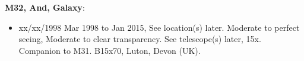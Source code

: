 {\bf M32, And, Galaxy}:
\begin{itemize}
\item xx/xx/1998 Mar 1998 to Jan 2015, See location(s) later. Moderate to perfect seeing, Moderate to clear transparency. See telescope(s) later, 15x. Companion to M31. B15x70, Luton, Devon (UK).
\end{itemize}
